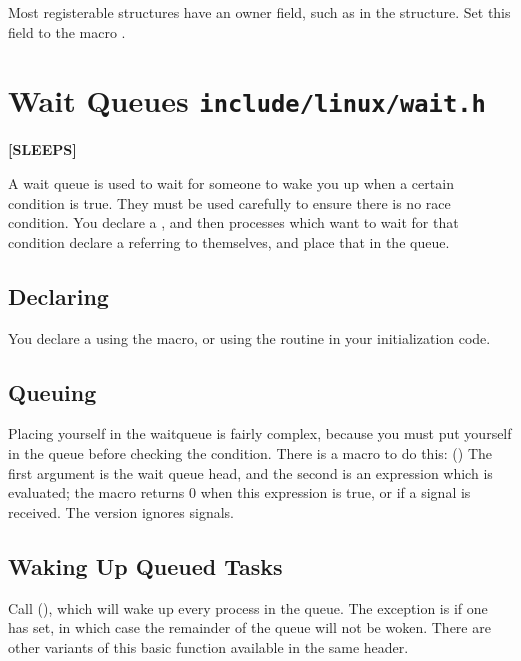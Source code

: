\documentclass[a4paper,8pt,english]{sphinxmanual}
\begin{document}
Most registerable structures have an owner field, such as in the
 structure.
Set this field to the macro .


\section{Wait Queues \texttt{include/linux/wait.h}}
\label{kernel-hacking/hacking:wait-queues-include-linux-wait-h}
\textbf{{[}SLEEPS{]}}

A wait queue is used to wait for someone to wake you up when a certain
condition is true. They must be used carefully to ensure there is no
race condition. You declare a , and then processes
which want to wait for that condition declare a 
referring to themselves, and place that in the queue.


\subsection{Declaring}
\label{kernel-hacking/hacking:declaring}
You declare a  using the
 macro, or using the
 routine in your initialization
code.


\subsection{Queuing}
\label{kernel-hacking/hacking:queuing}
Placing yourself in the waitqueue is fairly complex, because you must
put yourself in the queue before checking the condition. There is a
macro to do this: 
() The first argument is the wait queue head, and
the second is an expression which is evaluated; the macro returns 0 when
this expression is true, or  if a signal is received. The
 version ignores signals.


\subsection{Waking Up Queued Tasks}
\label{kernel-hacking/hacking:waking-up-queued-tasks}
Call  (), which will wake
up every process in the queue. The exception is if one has
 set, in which case the remainder of the queue will
not be woken. There are other variants of this basic function available
in the same header.
\end{document}
